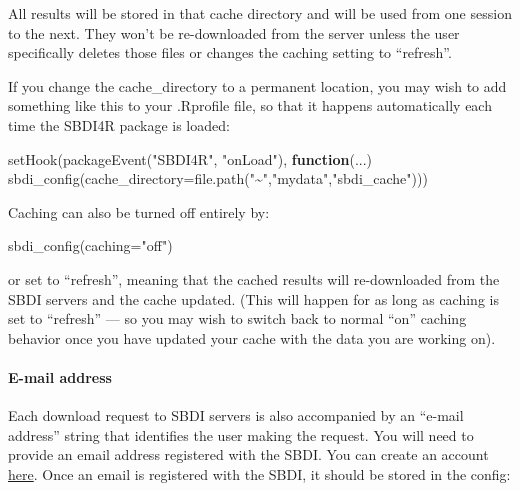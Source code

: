 \documentclass[
  10pt,
]{article}
\newenvironment{Shaded}{\begin{snugshade}}{\end{snugshade}}
\newcommand{\AttributeTok}[1]{\textcolor[rgb]{0.77,0.63,0.00}{#1}}
\newcommand{\ControlFlowTok}[1]{\textcolor[rgb]{0.13,0.29,0.53}{\textbf{#1}}}
\newcommand{\FunctionTok}[1]{\textcolor[rgb]{0.00,0.00,0.00}{#1}}
\newcommand{\NormalTok}[1]{#1}
\newcommand{\StringTok}[1]{\textcolor[rgb]{0.31,0.60,0.02}{#1}}
\begin{document}
All results will be stored in that cache directory and will be used from one session to the next. They won't be re-downloaded from the server unless the user specifically deletes those files or changes the caching setting to ``refresh''.

If you change the cache\_directory to a permanent location, you may wish to add something like this to your .Rprofile file, so that it happens automatically each time the SBDI4R package is loaded:

\begin{Shaded}
\begin{Highlighting}[]
\FunctionTok{setHook}\NormalTok{(}\FunctionTok{packageEvent}\NormalTok{(}\StringTok{"SBDI4R"}\NormalTok{, }\StringTok{"onLoad"}\NormalTok{), }
        \ControlFlowTok{function}\NormalTok{(...) }\FunctionTok{sbdi\_config}\NormalTok{(}\AttributeTok{cache\_directory=}\FunctionTok{file.path}\NormalTok{(}\StringTok{"\textasciitilde{}"}\NormalTok{,}\StringTok{"mydata"}\NormalTok{,}\StringTok{"sbdi\_cache"}\NormalTok{)))}
\end{Highlighting}
\end{Shaded}

Caching can also be turned off entirely by:

\begin{Shaded}
\begin{Highlighting}[]
\FunctionTok{sbdi\_config}\NormalTok{(}\AttributeTok{caching=}\StringTok{"off"}\NormalTok{)}
\end{Highlighting}
\end{Shaded}

or set to ``refresh'', meaning that the cached results will re-downloaded from the SBDI servers and the cache updated. (This will happen for as long as caching is set to ``refresh'' --- so you may wish to switch back to normal ``on'' caching behavior once you have updated your cache with the data you are working on).

\hypertarget{e-mail-address}{%
\paragraph*{E-mail address}\label{e-mail-address}}

Each download request to SBDI servers is also accompanied by an ``e-mail address'' string that identifies the user making the request. You will need to provide an email address registered with the SBDI. You can create an account \href{https://auth.biodiversitydata.se/cas/login}{here}. Once an email is registered with the SBDI, it should be stored in the config:
\end{document}
